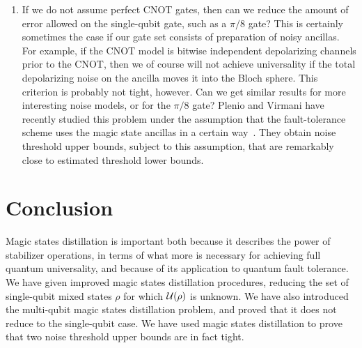 \documentclass[11pt]{article}
\def\ket #1{\vert #1\rangle}
\def\bra #1{\langle #1\vert}
\def\ketbra #1#2{\ket{#1}\!\bra{#2}}
\theoremstyle{note}
\begin{document}
\begin{enumerate}
In fact, if $\mathcal E$ is the $\pi/8$ gate with depolarizing noise, this equivalence is much simpler; teleporting into $({\boldsymbol 1} \otimes \mathcal E)(\ketbra{\Psi}{\Psi})$ can be accomplished deterministically.  Since the $\pi/8$ gate is in $C_3$, the set of operators that conjugate Paulis to Cliffords, any required correction is always a Clifford and can be applied~\cite{GottesmanChuang99teleportation}.  The depolarizing noise commutes past the correction.

Therefore, without loss of generality we may assume that $\mathcal E$ is applied to the second half of $\ket{\Psi}$.  But can one always distill the resulting state by first applying a two-to-one-qubit stabilizer reduction?

\item
If we do not assume perfect CNOT gates, then can we reduce the amount of error allowed on the single-qubit gate, such as a $\pi/8$ gate?  This is certainly sometimes the case if our gate set consists of preparation of noisy ancillas.  For example, if the CNOT model is bitwise independent depolarizing channels prior to the CNOT, then we of course will not achieve universality if the total depolarizing noise on the ancilla moves it into the Bloch sphere.  This criterion is probably not tight, however.  Can we get similar results for more interesting noise models, or for the $\pi/8$ gate?  Plenio and Virmani have recently studied this problem under the assumption that the fault-tolerance scheme uses the magic state ancillas in a certain way~\cite{PlenioVirmani08magic}.  They obtain noise threshold upper bounds, subject to this assumption, that are remarkably close to estimated threshold lower bounds.  
\end{enumerate}


\section{Conclusion}

Magic states distillation is important both because it describes the power of stabilizer operations, in terms of what more is necessary for achieving full quantum universality, and because of its application to quantum fault tolerance.  We have given improved magic states distillation procedures, reducing the set of single-qubit mixed states $\rho$ for which $\mathcal{U}(\rho)$ is unknown.  We have also introduced the multi-qubit magic states distillation problem, and proved that it does not reduce to the single-qubit case.  We have used magic states distillation to prove that two noise threshold upper bounds are in fact tight.  
\end{document}
